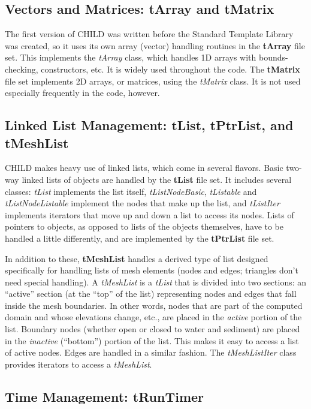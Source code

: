 \documentclass[12pt]{article}
\begin{document}
\subsection{Vectors and Matrices: tArray and tMatrix}

The first version of CHILD was written before the Standard Template Library 
was created, so it uses its own array (vector) handling routines in the 
{\bf tArray} file set. This implements the {\em tArray} class, which handles 
1D arrays with bounds-checking, constructors, etc. It is widely used 
throughout the code. The {\bf tMatrix} file set implements 2D arrays, or 
matrices, using the {\em tMatrix} class. It is not used especially frequently 
in the code, however.

\subsection{Linked List Management: tList, tPtrList, and tMeshList}

CHILD makes heavy use of linked lists, which come in several flavors. Basic 
two-way linked lists of objects are handled by the {\bf tList} file set. It 
includes several classes: {\em tList} implements the list itself, 
{\em tListNodeBasic}, {\em tListable} and {\em tListNodeListable} implement 
the nodes that make up the list, and {\em tListIter} implements iterators that 
move up and down a list to access its nodes. Lists of pointers to objects, as 
opposed to lists of the objects themselves, have to be handled a little 
differently, and are implemented by the {\bf tPtrList} file set.

In addition to these, {\bf tMeshList} handles a derived type of list designed 
specifically for handling lists of mesh elements (nodes and edges; triangles
don't need special handling). A 
{\em tMeshList} is a {\em tList} that is divided into two sections: an 
``active'' section (at the ``top'' of the list) representing nodes and edges 
that fall inside the mesh boundaries. In other words, nodes that are part of 
the computed domain and whose elevations change, etc., are placed in the 
{\em active} portion of the list. Boundary nodes (whether open or closed to 
water and sediment) are placed in the {\em inactive} (``bottom'') portion of 
the list. This makes it easy to access a list of active nodes. Edges are 
handled in a similar fashion. The {\em tMeshListIter} class provides 
iterators to access a {\em tMeshList}.

\subsection{Time Management: tRunTimer}
\end{document}

